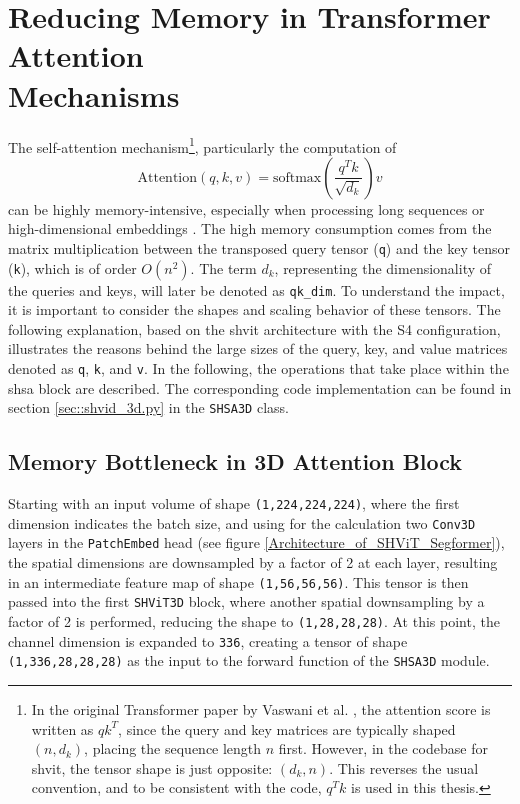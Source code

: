 \section[Reducing Memory in Transformer Attention Mechanisms]{Reducing Memory in Transformer Attention \\ Mechanisms} \label{Transformer_Attention_Mechanisms}
The self-attention mechanism\footnote{In the original Transformer paper by Vaswani et al. \cite{vaswani2023attentionneed}, the attention score is written as $qk^T$, since the query and key matrices are typically shaped $(n,d_k)$, placing the sequence length $n$ first. However, in the codebase for \gls{shvit}, the tensor shape is just opposite: $(d_k,n)$. This reverses the usual convention, and to be consistent with the code, $q^Tk$ is used in this thesis.}, particularly the computation of 
\begin{equation}
	\text{Attention}(q, k, v) = \text{softmax}\left(\frac{q^T k}{\sqrt{d_k}}\right)v
\end{equation}
can be highly memory-intensive, especially when processing long sequences or high-dimensional embeddings \cite{vaswani2023attentionneed}. The high memory consumption comes from the matrix multiplication between the transposed query tensor ({\tt q}) and the key tensor ({\tt k}), which is of order $O(n^2)$. The term $d_k$, representing the dimensionality of the queries and keys, will later be denoted as {\tt qk\_dim}. To understand the impact, it is important to consider the shapes and scaling behavior of these tensors. The following explanation, based on the \gls{shvit} architecture with the S4 configuration, illustrates the reasons behind the large sizes of the query, key, and value matrices denoted as {\tt q}, {\tt k}, and {\tt v}. In the following, the operations that take place within the \gls{shsa} block are described. The corresponding code implementation can be found in section \ref{sec::shvid_3d.py} in the {\tt SHSA3D} class.


\subsection{Memory Bottleneck in 3D Attention Block}
Starting with an input volume of shape {\tt (1,224,224,224)}, where the first dimension indicates the batch size,  and using for the calculation two {\tt Conv3D} layers in the {\tt PatchEmbed} head (see figure \ref{Architecture_of_SHViT_Segformer}), the spatial dimensions are downsampled by a factor of 2 at each layer, resulting in an intermediate feature map of shape {\tt (1,56,56,56)}. This tensor is then passed into the first {\tt SHViT3D} block, where another spatial downsampling by a factor of 2 is performed, reducing the shape to {\tt (1,28,28,28)}. At this point, the channel dimension is expanded to {\tt 336}, creating a tensor of shape {\tt (1,336,28,28,28)} as the input to the forward function of the {\tt SHSA3D} module.


